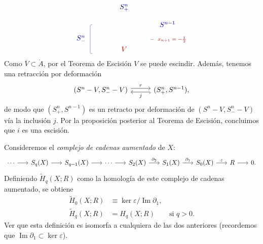 \begin{dem}
\[\begin{tikzpicture}[baseline=(current bounding box.center), scale=0.75]
    \node[blue!55!black] at (0,  1.08) {$S_+^n$};
    \node[red!65!black]  at (0, -1.66) {$V$};

    \node[blue!55!black, right=4pt] at (2.0, 0) {$S^{n-1}$};
    \draw[thin, red!55!black!70] (1.76, -1.0206) -- (1.96, -1.0206);
    \node[red!65!black, right=2pt] at (1.96, -1.0206) {\scriptsize $x_{n+1} = -\tfrac{1}{2}$};

    \draw[thin, blue!55!black!70, rounded corners=2pt]
        (-2.12, -0.04) -- (-2.26, -0.04) -- (-2.26, -1.96) -- (-2.12, -1.96);
    \node[blue!55!black, left=3pt] at (-2.26, -1.00) {$S_-^n$};
\end{tikzpicture}
\]
Como $\overline{V} \subset \mathring{A}$, por el Teorema de Escisión $V$ se puede escindir. Además, tenemos una retracción por deformación
\[
\begin{tikzcd}[column sep=2.8em]
(S^n - V, S_-^n - V) \arrow[r, shift left=0.6ex, "r"] & (S_+^n, S^{n-1}), \arrow[l, hook, shift left=0.6ex, "j"]
\end{tikzcd}
\]
de modo que $(S_+^n, S^{n-1})$ es un retracto por deformación de $(S^n - V, S_-^n - V)$ vía la inclusión $j$. Por la proposición posterior al Teorema de Escisión, concluimos que $i$ es una escisión.
\end{dem}

\begin{ejercicio}
Consideremos el \textit{complejo de cadenas aumentado} de $X$:
\[
\begin{tikzcd}[column sep=1.7em]
\cdots \arrow[r] & S_q(X) \arrow[r] & S_{q-1}(X) \arrow[r] & \cdots \arrow[r] & S_2(X) \arrow[r, "\partial_2"] & S_1(X) \arrow[r, "\partial_1"] & S_0(X) \arrow[r, "\varepsilon"] & R \arrow[r] & 0.
\end{tikzcd}
\]
Definiendo $\widetilde{H}_q(X; R)$ como la homología de este complejo de cadenas aumentado, se obtiene
\begin{align*}
\widetilde{H}_0(X; R) &\equiv \ker\varepsilon / \operatorname{Im}\partial_1, \\
\widetilde{H}_q(X; R) &= H_q(X; R) \qquad \text{si } q > 0.
\end{align*}
Ver que esta definición es isomorfa a cualquiera de las dos anteriores (recordemos que $\operatorname{Im}\partial_1 \subset \ker\varepsilon$).
\end{ejercicio}

